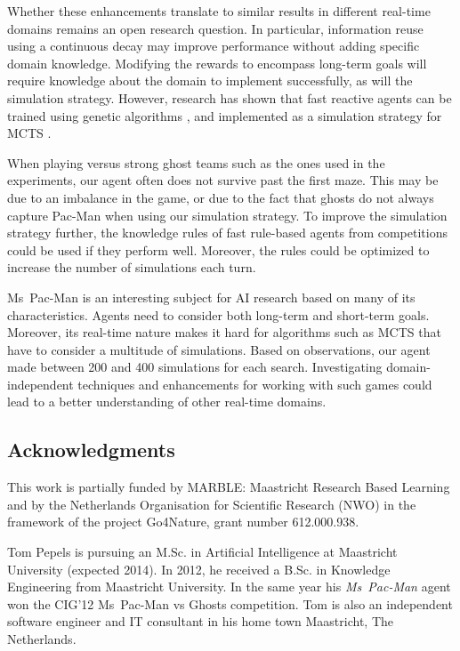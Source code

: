 \documentclass[journal]{IEEEtran}
\begin{document}
Whether these enhancements translate to similar results in different real-time domains remains an open research question. In particular, information reuse using a continuous decay may improve performance without adding specific domain knowledge. Modifying the rewards to encompass long-term goals will require knowledge about the domain to implement successfully, as will the simulation strategy. However, research has shown that fast reactive agents can be trained using genetic algorithms \cite{brandstetterreactive,alhejali2010evolving}, and implemented as a simulation strategy for MCTS \cite{alhejali2013genetic}.

When playing versus strong ghost teams such as the ones used in the experiments, our agent often does not survive past the first maze. This may be due to an imbalance in the game, or due to the fact that ghosts do not always capture Pac-Man when using our simulation strategy. 
To improve the simulation strategy further, the knowledge rules of fast rule-based agents from competitions could be used if they perform well. Moreover, the rules could be optimized to increase the number of simulations each turn.

Ms~Pac-Man is an interesting subject for AI research based on many of its characteristics. Agents need to consider both long-term and short-term goals. Moreover, its real-time nature makes it hard for algorithms such as MCTS that have to consider a multitude of simulations. Based on observations, our agent made between 200 and 400 simulations for each search. Investigating domain-independent techniques and enhancements for working with such games could lead to a better understanding of other real-time domains.

\subsection*{Acknowledgments}
This work is partially funded by MARBLE: Maastricht Research Based Learning and by the Netherlands Organisation for
Scientific Research (NWO) in the framework of the project Go4Nature, grant number 612.000.938.




\begin{IEEEbiography}{Tom Pepels} is pursuing an M.Sc. in Artificial Intelligence at Maastricht University (expected 2014). In 2012, he received a B.Sc. in Knowledge Engineering from Maastricht University. In the same year his {\it{Ms~Pac-Man}} agent won the CIG'12 Ms~Pac-Man vs Ghosts competition. Tom is also an independent software engineer and IT consultant in his home town Maastricht, The Netherlands.
\end{IEEEbiography}
\end{document}

